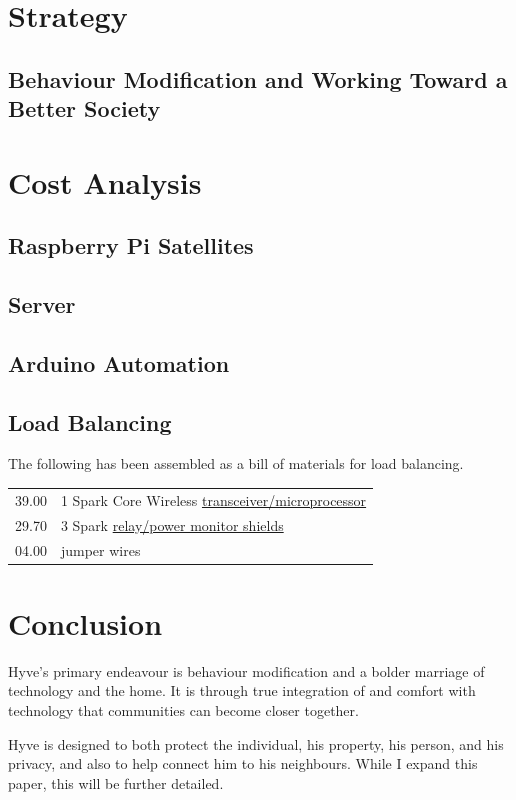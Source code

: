 			\begin{multicols}{2}
		
		
			
\section{Strategy}

	\subsection{Behaviour Modification and Working Toward a Better Society}
			
			
\section{Cost Analysis}

	\subsection{Raspberry Pi Satellites}
	
	\subsection{Server}
	
	\subsection{Arduino Automation}
	
	\subsection{Load Balancing}
	
		The following has been assembled as a bill of materials for load balancing. \\
		\begin{tabular}{r|l}
			39.00 &	1 Spark Core Wireless \href{https://www.spark.io}{transceiver/microprocessor} \\
			29.70 & 3  Spark \href{http://oshpark.com/shared_projects/E1XSjK44}{relay/power monitor shields} \\
			04.00 & jumper wires
		\end{tabular}
		
\section{Conclusion}

	Hyve's primary endeavour is behaviour modification and a bolder marriage of technology and the home.
	It is through true integration of and comfort with technology that communities can become closer together.
	
	Hyve is designed to both protect the individual, his property, his person, and his privacy, and also to help connect him to his neighbours.
	While I expand this paper, this will be further detailed.

\end{multicols}
